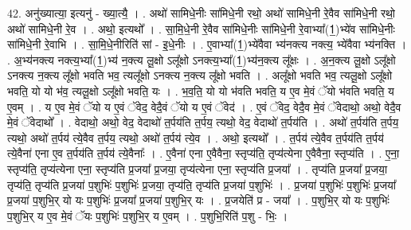 \documentclass[17pt]{extarticle}
\begin{document}
42. अनु॑ख्यात्या॒ इत्यनु॑ - ख्या॒त्यै॒ । . अथो॑ सामिधे॒नीः सा॑मिधे॒नी रथो॒ अथो॑ सामिधे॒नी रे॒वैव सा॑मिधे॒नी रथो॒ अथो॑ सामिधे॒नी रे॒व । . अथो॒ इत्यथो᳚ । . सा॒मि॒धे॒नी रे॒वैव सा॑मिधे॒नीः सा॑मिधे॒नी रे॒वाभ्या᳚(1॒)भ्ये॑व सा॑मिधे॒नीः सा॑मिधे॒नी रे॒वाभि । . सा॒मि॒धे॒नीरिति॑ सां - इ॒धे॒नीः । . ए॒वाभ्या᳚(1॒)भ्ये॑वैवा भ्य॑नक्त्य नक्त्य॒ भ्ये॑वैवा भ्य॑नक्ति । . अ॒भ्य॑नक्त्य नक्त्य॒भ्या᳚(1॒)भ्य॑ न॒क्त्य लू॒क्षो ऽलू᳚क्षो ऽनक्त्य॒भ्या᳚(1॒)भ्य॑न॒क्त्य लू᳚क्षः । . अ॒न॒क्त्य लू॒क्षो ऽलू᳚क्षो ऽनक्त्य न॒क्त्य लू᳚क्षो भवति भव॒ त्यलू᳚क्षो ऽनक्त्य न॒क्त्य लू᳚क्षो भवति । . अलू᳚क्षो भवति भव॒ त्यलू॒क्षो ऽलू᳚क्षो भवति॒ यो यो भ॑व॒ त्यलू॒क्षो ऽलू᳚क्षो भवति॒ यः । . भ॒व॒ति॒ यो यो भ॑वति भवति॒ य ए॒व मे॒वं ॅयो भ॑वति भवति॒ य ए॒वम् । . य ए॒व मे॒वं ॅयो य ए॒वं ॅवेद॒ वेदै॒वं ॅयो य ए॒वं ॅवेद॑ । . ए॒वं ॅवेद॒ वेदै॒व मे॒वं ॅवेदाथो॒ अथो॒ वेदै॒व मे॒वं ॅवेदाथो᳚ । . वेदाथो॒ अथो॒ वेद॒ वेदाथो॑ त॒र्पय॑ति त॒र्पय॒ त्यथो॒ वेद॒ वेदाथो॑ त॒र्पय॑ति । . अथो॑ त॒र्पय॑ति त॒र्पय॒ त्यथो॒ अथो॑ त॒र्पय॑ त्ये॒वैव त॒र्पय॒ त्यथो॒ अथो॑ त॒र्पय॑ त्ये॒व । . अथो॒ इत्यथो᳚ । . त॒र्पय॑ त्ये॒वैव त॒र्पय॑ति त॒र्पय॑ त्ये॒वैना॑ एना ए॒व त॒र्पय॑ति त॒र्पय॑ त्ये॒वैनाः᳚ । . ए॒वैना॑ एना ए॒वैवैना॒ स्तृप्य॑ति॒ तृप्य॑त्येना ए॒वैवैना॒ स्तृप्य॑ति । . ए॒ना॒ स्तृप्य॑ति॒ तृप्य॑त्येना एना॒ स्तृप्य॑ति प्र॒जया᳚ प्र॒जया॒ तृप्य॑त्येना एना॒ स्तृप्य॑ति प्र॒जया᳚ । . तृप्य॑ति प्र॒जया᳚ प्र॒जया॒ तृप्य॑ति॒ तृप्य॑ति प्र॒जया॑ प॒शुभिः॑ प॒शुभिः॑ प्र॒जया॒ तृप्य॑ति॒ तृप्य॑ति प्र॒जया॑ प॒शुभिः॑ । . प्र॒जया॑ प॒शुभिः॑ प॒शुभिः॑ प्र॒जया᳚ प्र॒जया॑ प॒शुभि॒र् यो यः प॒शुभिः॑ प्र॒जया᳚ प्र॒जया॑ प॒शुभि॒र् यः । . प्र॒जयेति॑ प्र - जया᳚ । . प॒शुभि॒र् यो यः प॒शुभिः॑ प॒शुभि॒र् य ए॒व मे॒वं ॅयः प॒शुभिः॑ प॒शुभि॒र् य ए॒वम् । . प॒शुभि॒रिति॑ प॒शु - भिः॒ । \newline
\pagebreak
{}
\end{document}
